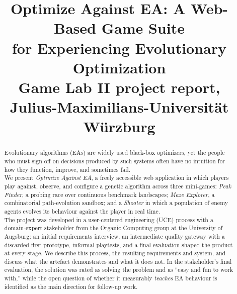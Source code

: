 \documentclass[conference]{IEEEtran}
\begin{document}
\title{Optimize Against EA: A Web-Based Game Suite\\ for Experiencing Evolutionary Optimization\\
{\footnotesize Game Lab II project report, Julius-Maximilians-Universit\"at W\"urzburg}
}

\author{
\and
{}
}

\maketitle

\begin{abstract}
Evolutionary algorithms (EAs) are widely used black-box optimizers, yet the people who must sign off on decisions produced by such systems often have no intuition for how they function, improve, and sometimes fail. \\
We present \emph{Optimize Against EA}, a freely accessible web application in which players play against, observe, and configure a genetic algorithm across three mini-games: \emph{Peak Finder}, a probing race over continuous benchmark landscapes; \emph{Maze Explorer}, a combinatorial path-evolution sandbox; and a \emph{Shooter} in which a population of enemy agents evolves its behaviour against the player in real time.\\
The project was developed in a user-centered engineering (UCE) process with a domain-expert stakeholder from the Organic Computing group at the University of Augsburg: an initial requirements interview, an intermediate quality gateway with a discarded first prototype, informal playtests, and a final evaluation shaped the product at every stage. We describe this process, the resulting requirements and system, and discuss what the artefact demonstrates and what it does not. In the stakeholder's final evaluation, the solution was rated as solving the problem and as ``easy and fun to work with,'' while the open question of whether it measurably \emph{teaches} EA behaviour is identified as the main direction for follow-up work.
\end{abstract}
\end{document}
